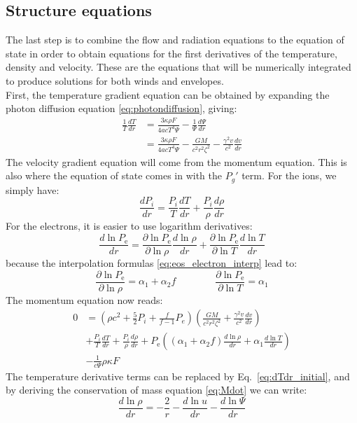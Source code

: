 \documentclass[../main.tex]{subfiles}
\begin{document}
\subsection{Structure equations}
The last step is to combine the flow and radiation equations to the equation of state in order to obtain equations for the first derivatives of the temperature, density and velocity. These are the equations that will be numerically integrated to produce solutions for both winds and envelopes.\\

First, the temperature gradient equation can be obtained by expanding the photon diffusion equation \eqref{eq:photondiffusion}, giving:
\begin{align}
    \frac{1}{T}\frac{dT}{dr}&=\frac{3\kappa\rho F}{4acT^4\Psi}-\frac{1}{\Psi}\frac{d\Psi}{dr}\nonumber\\
    &=\frac{3\kappa\rho F}{4acT^4\Psi}-\frac{GM}{c^2r^2\zeta^2}-\frac{\gamma^2v}{c^2}\frac{dv}{dr}\label{eq:dTdr_initial}
\end{align}
The velocity gradient equation will come from the momentum equation. This is also where the equation of state comes in with the $P_g'$ term. For the ions, we simply have:
\begin{equation}
    \frac{dP_i}{dr}=\frac{P_i}{T}\frac{dT}{dr}+\frac{P_i}{\rho}\frac{d\rho}{dr}
\end{equation}
For the electrons, it is easier to use logarithm derivatives:
\begin{equation}
    \frac{d\ln P_\text{e}}{dr}=\frac{\partial \ln P_\text{e}}{\partial\ln\rho}\frac{d\ln\rho}{dr} + \frac{\partial \ln P_\text{e}}{\partial\ln T}\frac{d\ln T}{dr}
\end{equation}
because the interpolation formulas \eqref{eq:eos_electron_interp} lead to:
\begin{equation}
    \frac{\partial \ln P_\text{e}}{\partial\ln\rho} = \alpha_1+\alpha_2 f \qquad\qquad
    \frac{\partial \ln P_\text{e}}{\partial\ln T}=\alpha_1
\end{equation}
The momentum equation now reads:
\begin{align}
     0 &= \left(\rho c^2+\frac{5}{2}P_i+\frac{f}{f-1}P_e\right)\left(\frac{GM}{c^2r^2\zeta^2}+\frac{\gamma^2v}{c^2}\frac{dv}{dr}\right) \nonumber\\
     & + \frac{P_i}{T}\frac{dT}{dr}+\frac{P_i}{\rho}\frac{d\rho}{dr} + P_\text{e}\left((\alpha_1+\alpha_2f)\frac{d\ln\rho}{dr}+\alpha_1\frac{d\ln T}{dr}\right) \nonumber\\
     & - \frac{1}{c\Psi}\rho\kappa F  \label{eq:unsolved_momentum}
\end{align}
The temperature derivative terms can be replaced by Eq.~\eqref{eq:dTdr_initial}, and by deriving the conservation of mass equation \eqref{eq:Mdot} we can write:
\begin{equation}\label{eq:mass_conservation_derivative}
    \frac{d\ln\rho}{dr}=-\frac{2}{r}-\frac{d\ln u}{dr}-\frac{d\ln\Psi}{dr}
\end{equation}
\end{document}
